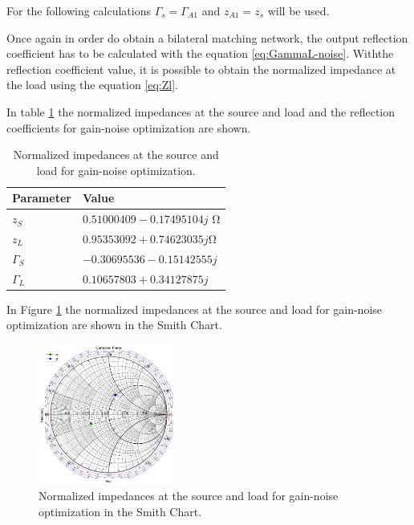 For the following calculations $\Gamma_s = \Gamma_{A1}$ and $z_{A1} = z_s$ will be used.

Once again in order do obtain a bilateral matching network, the output reflection coefficient has to be calculated with the equation  \ref{eq:GammaL-noise}. Withthe reflection coefficient value, it is possible to obtain the normalized impedance at the load using the equation \ref{eq:Zl}.

In table \ref{gain-noise-impedances} the normalized impedances at the source and load and the reflection coefficients for gain-noise optimization are shown.

\begin{table}[H]
    \centering
    \caption{Normalized impedances at the source and load for gain-noise optimization.}
    \begin{tabularx}{\textwidth}{>{\centering\arraybackslash}X >{\centering\arraybackslash}X}
        \toprule
        \textbf{Parameter} & \textbf{Value} \\
        \midrule
        $z_{S}$     & $0.51000409-0.17495104j$ \si{\ohm} \\
        \midrule
        $z_{L}$     & $0.95353092+0.74623035j$\si{\ohm}\\
        \midrule
        $\Gamma_{S}$     & $-0.30695536-0.15142555j$\\
        \midrule
        $\Gamma_{L}$     & $0.10657803+0.34127875j$\\
        \bottomrule
    \end{tabularx}
    \label{gain-noise-impedances}
\end{table}

In Figure \ref{fig:ZsZl-gain-noise} the normalized impedances at the source and load for gain-noise optimization are shown in the Smith Chart.

\begin{figure}[H]
    \centering
    \includegraphics[width=0.4\textwidth]{Images/gain-noise-SC.png}
    \caption{Normalized impedances at the source and load for gain-noise optimization in the Smith Chart.}
    \label{fig:ZsZl-gain-noise}
\end{figure}

